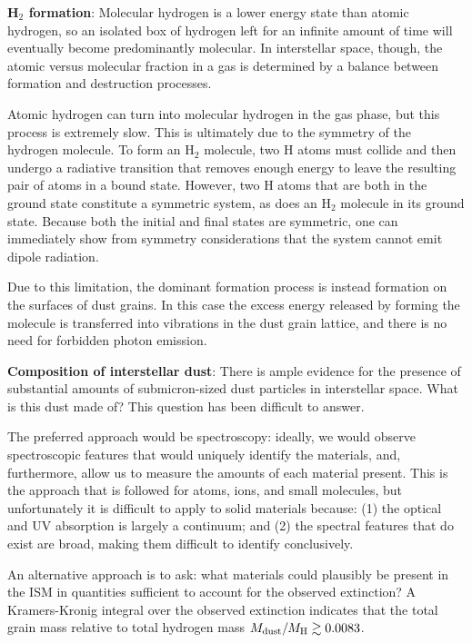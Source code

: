 \documentclass[a4paper,10pt]{article}
\begin{document}
{\noindent}\textbf{H$_2$ formation}: Molecular hydrogen is a lower energy state than atomic hydrogen, so an isolated box of hydrogen left for an infinite amount of time will eventually become predominantly molecular. In interstellar space, though, the atomic versus molecular fraction in a gas is determined by a balance between formation and destruction processes.

{\noindent}Atomic hydrogen can turn into molecular hydrogen in the gas phase, but this process is extremely slow. This is ultimately due to the symmetry of the hydrogen molecule. To form an H$_2$ molecule, two H atoms must collide and then undergo a radiative transition that removes enough energy to leave the resulting pair of atoms in a bound state. However, two H atoms that are both in the ground state constitute a symmetric system, as does an H$_2$ molecule in its ground state. Because both the initial and final states are symmetric, one can immediately show from symmetry considerations that the system cannot emit dipole radiation.

{\noindent}Due to this limitation, the dominant formation process is instead formation on the surfaces of dust grains. In this case the excess energy released by forming the molecule is transferred into vibrations in the dust grain lattice, and there is no need for forbidden photon emission.

{\noindent}\textbf{Composition of interstellar dust}: There is ample evidence for the presence of substantial amounts of submicron-sized dust particles in interstellar space. What is this dust made of? This question has been difficult to answer.

{\noindent}The preferred approach would be spectroscopy: ideally, we would observe spectroscopic features that would uniquely identify the materials, and, furthermore, allow us to measure the amounts of each material present. This is the approach that is followed for atoms, ions, and small molecules, but unfortunately it is difficult to apply to solid materials because: (1) the optical and UV absorption is largely a continuum; and (2) the spectral features that do exist are broad, making them difficult to identify conclusively.

{\noindent}An alternative approach is to ask: what materials could plausibly be present in the ISM in quantities sufficient to account for the observed extinction? A Kramers-Kronig integral over the observed extinction indicates that the total grain mass relative to total hydrogen mass $M_{\rm dust}/M_{\rm H}\gtrsim0.0083$.
\end{document}
